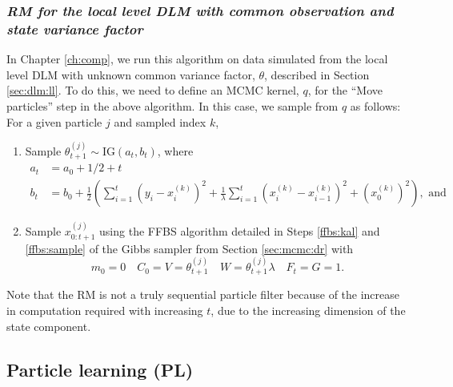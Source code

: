 \subsubsection{\emph{RM for the local level DLM with common observation and state variance factor} \label{sec:rm:ll}}

In Chapter \ref{ch:comp}, we run this algorithm on data simulated from the local level DLM with unknown common variance factor, $\theta$, described in Section \ref{sec:dlm:ll}. To do this, we need to define an MCMC kernel, $q$, for the ``Move particles'' step in the above algorithm. In this case, we sample from $q$ as follows: For a given particle $j$ and sampled index $k$,
\begin{enumerate}
\item \label{step:move:ll} Sample $\theta^{(j)}_{t+1} \sim \mbox{IG}(a_t, b_t)$, where
\begin{align*}
a_t &= a_0 + 1/2 + t \\
b_t &= b_0 + \frac{1}{2}\left(\sum_{i=1}^t \left(y_i - x_i^{(k)}\right)^2 + \frac{1}{\lambda}\sum_{i=1}^t \left(x_i^{(k)} - x_{i-1}^{(k)}\right)^2 + \left(x^{(k)}_0\right)^2\right),\mbox{ and}
\end{align*}
\item Sample $x_{0:t+1}^{(j)}$ using the FFBS algorithm detailed in Steps \ref{ffbs:kal} and \ref{ffbs:sample} of the Gibbs sampler from Section \ref{sec:mcmc:dr} with
\[m_0 = 0 \quad C_0 = V = \theta^{(j)}_{t+1} \quad W = \theta_{t+1}^{(j)}\lambda \quad F_t = G = 1.\]
\end{enumerate}
Note that the RM is not a truly sequential particle filter because of the increase in computation required with increasing $t$, due to the increasing dimension of the state component.

\subsection{Particle learning (PL) \label{sec:pl}}

